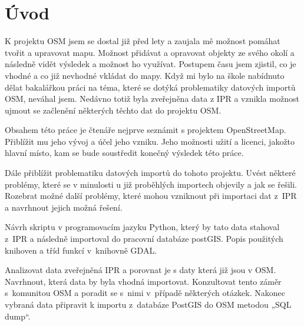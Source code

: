 \chapter{Úvod}
\label{1-uvod}

K projektu OSM jsem se dostal již před lety a zaujala mě možnost pomáhat tvořit 
a upravovat mapu. Možnost přidávat a opravovat objekty ze svého okolí a následně 
vidět výsledek a možnost ho využívat. Postupem času jsem zjistil, co je vhodné a 
co již nevhodné vkládat do mapy. Když mi bylo na škole nabídnuto dělat 
bakalářkou práci na téma, které se dotýká problematiky datových importů OSM, 
neváhal jsem. Nedávno totiž byla zveřejněna data z IPR a vznikla možnost ujmout 
se začlenění některých těchto dat do projektu OSM. 

Obsahem této práce je čtenáře nejprve seznámit s projektem OpenStreetMap. 
Přiblížit mu jeho vývoj a účel jeho vzniku. Jeho možnosti užití a licenci, 
jakožto hlavní místo, kam se bude soustředit konečný výsledek této práce.

Dále přiblížit problematiku datových importů do tohoto projektu. Uvést některé 
problémy, které se v minulosti u již proběhlých importech objevily a jak se 
řešili. Rozebrat možné další problémy, které mohou vzniknout při importaci dat 
z~IPR a navrhnout jejich možná řešení. 

Návrh skriptu v programovacím jazyku Python, který by tato data stahoval z~IPR 
a následně importoval do pracovní databáze postGIS. Popis použitých knihoven a 
tříd funkcí v~knihovně GDAL.

Analizovat data zveřejněná IPR a porovnat je s daty která již jsou v OSM. 
Navrhnout, která data by byla vhodná importovat. Konzultovat tento záměr 
s~komunitou OSM a poradit se s~nimi v~případě některých otázkek. Nakonec 
vybraná data připravit k importu z~databáze PostGIS do OSM metodou „SQL dump“.
